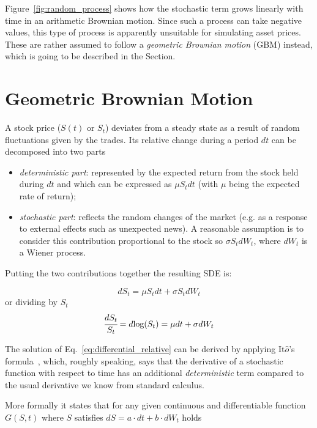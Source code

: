 Figure~\ref{fig:random_process} shows how the stochastic term grows linearly with time in an arithmetic Brownian motion.
Since such a process can take negative values, this type of process is apparently unsuitable for simulating asset prices. These are rather assumed to follow a \emph{geometric Brownian motion} (GBM) instead, which is going to be described in the Section. 

\section{Geometric Brownian Motion}
\label{derivation-of-log-normal-stochastic-differential-equation}

A stock price ($S(t)$ or $S_t$) deviates from a steady state as a result of random fluctuations given by the trades. 
Its relative change during a period $dt$ can be decomposed into two parts

\begin{itemize}
\tightlist
\item \emph{deterministic part}: represented by the expected return from the stock held during $dt$ and which can be expressed as $\mu S_tdt$ (with $\mu$ being the expected rate of return);
\item \emph{stochastic part}: reflects the random changes of the market (e.g. as a response to external effects such as unexpected news). A reasonable assumption is to consider this contribution proportional to the stock so $\sigma S_t dW_t$, where $dW_t$ is a Wiener process.
\end{itemize}
Putting the two contributions together the resulting SDE is:

\begin{equation}
dS_t = \mu S_t dt + \sigma S_t dW_t
\label{eq:differential}
\end{equation}
or dividing by $S_t$
\begin{equation}
\cfrac{dS_t}{S_t} = d\textrm{log}(S_t) = \mu dt + \sigma dW_t
\label{eq:differential_relative}
\end{equation}

The solution of Eq.~\ref{eq:differential_relative} can be derived by applying It$\hat{o}$'s formula~\cite{bib:ito_lemma}, which, roughly speaking, says that the derivative of a stochastic function with respect to time has an additional \emph{deterministic} term compared to the usual derivative we know from standard calculus. 

More formally it states that for any given continuous and differentiable function $G(S, t)$ where $S$ satisfies $dS=a\cdot dt +b\cdot dW_t$ holds

